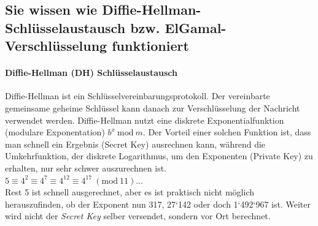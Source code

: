 \documentclass[10pt,a4paper]{article}
\begin{document}
\subsection*{Sie wissen wie Diffie-Hellman-Schlüsselaustausch bzw. ElGamal-Verschlüsselung funktioniert}

\paragraph*{Diffie-Hellman (DH) Schlüsselaustausch}Diffie-Hellman ist ein Schlüsselvereinbarungsprotokoll. Der vereinbarte gemeinsame geheime Schlüssel kann danach zur Verschlüsselung der Nachricht verwendet werden. Diffie-Hellman nutzt eine diskrete Exponentialfunktion (modulare Exponentation) $b^x\ \mathrm{mod}\ m$. Der Vorteil einer solchen Funktion ist, dass man schnell ein Ergebnis (Secret Key) ausrechnen kann, während die Umkehrfunktion, der diskrete Logarithmus, um den Exponenten (Private Key) zu erhalten, nur sehr schwer auszurechnen ist.\\
$5\equiv 4^{2} \equiv 4^{7} \equiv 4^{12} \equiv 4^{17}\ (\mathrm{mod}\ 11)\dots$\\
Rest 5  ist schnell ausgerechnet, aber es ist praktisch nicht möglich herauszufinden, ob der Exponent  nun 317, 27`142 oder doch 1`492`967 ist. Weiter wird nicht der \textsl{Secret Key} selber versendet, sondern vor Ort berechnet.

\pagebreak
\end{document}
